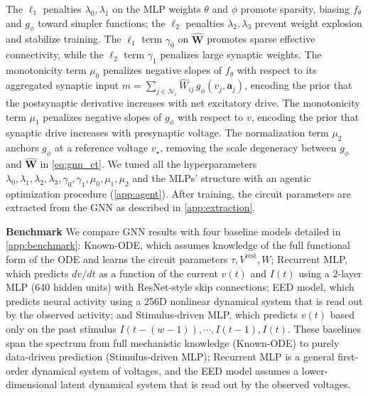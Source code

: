 \documentclass{article}
\def\stimbase{Stimulus-driven MLP}
\def\eedbase{EED model}
\def\mlpbase{Recurrent MLP}
\def\vrest{V^{\mathrm{rest}}}
\begin{document}
The $\ell_1$ penalties $\lambda_0,\lambda_1$ on the MLP weights $\theta$ and $\phi$ promote sparsity, biasing $f_\theta$ and $g_\phi$ toward simpler functions; the $\ell_2$ penalties $\lambda_2,\lambda_3$ prevent weight explosion and stabilize training. The $\ell_1$ term $\gamma_0$ on $\hat{\mathbf{W}}$ promotes sparse effective connectivity, while the $\ell_2$ term $\gamma_1$ penalizes large synaptic weights. The monotonicity term $\mu_0$ penalizes negative slopes of $f_\theta$ with respect to its aggregated synaptic input $m=\sum_{j\in\mathcal{N}_i}\hat{W}_{ij}\,g_\phi(v_j,\mathbf{a}_j)$, encoding the prior that the postsynaptic derivative increases with net excitatory drive. The monotonicity term $\mu_1$ penalizes negative slopes of $g_\phi$ with respect to $v$, encoding the prior that synaptic drive increases with presynaptic voltage. The normalization term $\mu_2$ anchors $g_\phi$ at a reference voltage $v_\star$, removing the scale degeneracy between $g_\phi$ and $\hat{\mathbf{W}}$ in \cref{eq:gnn_ct}. We tuned all the hyperparameters $\lambda_0,\lambda_1,\lambda_2,\lambda_3,\gamma_0,\gamma_1,\mu_0,\mu_1,\mu_2$ and the MLPs' structure with an agentic optimization procedure (\cref{app:agent}). After training, the circuit parameters are extracted from the GNN as described in \cref{app:extraction}.


\textbf{Benchmark}
We compare GNN results with four baseline models detailed in \cref{app:benchmark}: Known-ODE, which assumes knowledge of the full functional form of the ODE and learns the circuit parameters $\tau, \vrest, W$; \mlpbase, which predicts $dv/dt$ as a function of the current $v(t)$ and $I(t)$ using a 2-layer MLP (640 hidden units) with ResNet-style skip connections; \eedbase, which predicts neural activity using a 256D nonlinear dynamical system that is read out by the observed activity; and Stimulus-driven MLP, which predicts $v(t)$ based only on the past stimulus $I(t-(w-1)), \cdots, I(t-1), I(t)$. These baselines span the spectrum from full mechanistic knowledge (Known-ODE) to purely data-driven prediction (\stimbase); \mlpbase{} is a general first-order dynamical system of voltages, and the \eedbase{} assumes a lower-dimensional latent dynamical system that is read out by the observed voltages.

\end{document}
